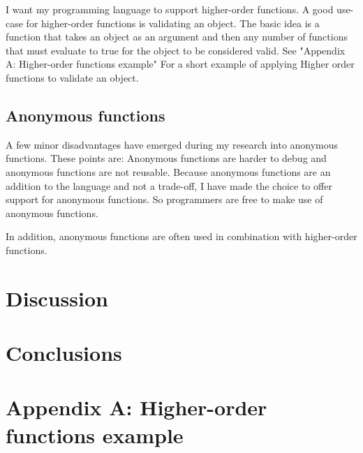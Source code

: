 \documentclass{uva-inf-article}
\begin{document}
I want my programming language to support higher-order functions.
A good use-case for higher-order functions is validating an object.
The basic idea is a function that takes an object as an argument and then any number of 
functions that must evaluate to true for the object to be considered valid.
See "Appendix A: Higher-order functions example" For a short example of applying 
Higher order functions to validate an object.

\subsection{Anonymous functions}
A few minor disadvantages have emerged during my research into anonymous functions. 
These points are:
Anonymous functions are harder to debug and anonymous functions are not reusable. 
Because anonymous functions are an addition to the language and not a trade-off, 
I have made the choice to offer support for anonymous functions. 
So programmers are free to make use of anonymous functions.

In addition, anonymous functions are often used in combination with higher-order functions.

\section{Discussion}

\section{Conclusions}


\printbibliography

\newpage
\section{Appendix A: Higher-order functions example}

\end{document}
